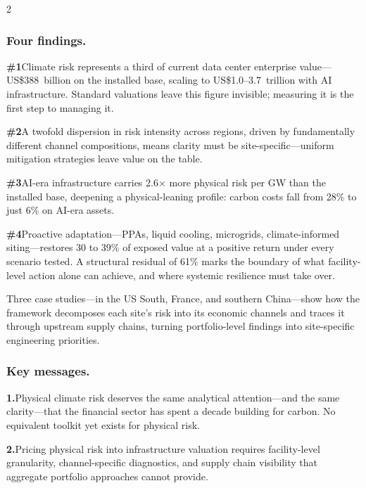 \begin{multicols}{2}
\subsubsection*{\textcolor{SEGreen}{Four findings.}}

\noindent\textbf{\textcolor{SEGreen}{\#1}}\enspace Climate risk represents a third of current data center enterprise value---US\$388~billion on the installed base, scaling to US\$1.0--3.7~trillion with AI infrastructure. Standard valuations leave this figure invisible; measuring it is the first step to managing it.

\noindent\textbf{\textcolor{SEGreen}{\#2}}\enspace A twofold dispersion in risk intensity across regions, driven by fundamentally different channel compositions, means clarity must be site-specific---uniform mitigation strategies leave value on the table.

\noindent\textbf{\textcolor{SEGreen}{\#3}}\enspace AI-era infrastructure carries 2.6$\times$ more physical risk per GW than the installed base, deepening a physical-leaning profile: carbon costs fall from 28\% to just 6\% on AI-era assets.

\noindent\textbf{\textcolor{SEGreen}{\#4}}\enspace Proactive adaptation---PPAs, liquid cooling, microgrids, climate-informed siting---restores 30 to 39\% of exposed value at a positive return under every scenario tested. A structural residual of 61\% marks the boundary of what facility-level action alone can achieve, and where systemic resilience must take over.

\noindent Three case studies---in the US South, France, and southern China---show how the framework decomposes each site's risk into its economic channels and traces it through upstream supply chains, turning portfolio-level findings into site-specific engineering priorities.

\subsubsection*{\textcolor{SEGreen}{Key messages.}}

\noindent\textbf{\textcolor{SEGreen}{1.}}\enspace Physical climate risk deserves the same analytical attention---and the same clarity---that the financial sector has spent a decade building for carbon. No equivalent toolkit yet exists for physical risk.

\noindent\textbf{\textcolor{SEGreen}{2.}}\enspace Pricing physical risk into infrastructure valuation requires facility-level granularity, channel-specific diagnostics, and supply chain visibility that aggregate portfolio approaches cannot provide.


\end{multicols}
